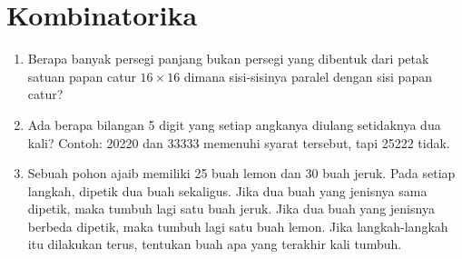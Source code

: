 \documentclass[12pt]{scrartcl}
\begin{document}
\section{Kombinatorika}
\begin{enumerate}[resume]
    \item Berapa banyak persegi panjang bukan persegi yang dibentuk dari petak satuan papan catur $16 \times 16$ dimana sisi-sisinya paralel dengan sisi papan catur?
    
    \item Ada berapa bilangan 5 digit yang setiap angkanya diulang setidaknya dua kali? Contoh: 20220 dan 33333 memenuhi syarat tersebut, tapi 25222 tidak.

    \item Sebuah pohon ajaib memiliki 25 buah lemon dan 30 buah jeruk. Pada setiap langkah, dipetik dua buah sekaligus. Jika dua buah yang jenisnya sama dipetik, maka tumbuh lagi satu buah jeruk. Jika dua buah yang jenisnya berbeda dipetik, maka tumbuh lagi satu buah lemon. Jika langkah-langkah itu dilakukan terus, tentukan buah apa yang terakhir kali tumbuh.
\end{enumerate}
	
	
\end{document}
